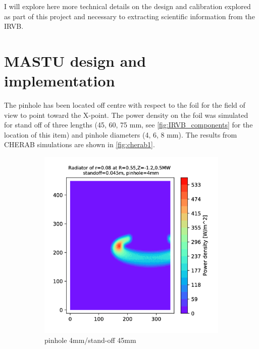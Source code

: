 I will explore here more technical details on the design and calibration explored as part of this project and necessary to extracting scientific information from the IRVB.
\section{MASTU design and implementation}\label{MASTUdesign}
The pinhole has been located off centre with respect to the foil for the field of view to point toward the X-point. The power density on the foil was simulated for stand off of three lengths (45, 60, 75 mm, see \autoref{fig:IRVB_components} for the location of this item) and pinhole diameters (4, 6, 8 mm). The results from CHERAB simulations are shown in \autoref{fig:cherab1}.


\begin{figure}
     \centering
     \begin{subfigure}{0.3\textwidth}
         \centering
         \includegraphics[trim={70 0 125 0},clip,width=\textwidth]{Chapters/appendix1/figs/4_45.png}
         \caption{pinhole 4mm/stand-off 45mm}
         \label{fig:4_45}
     \end{subfigure}
     \hfill
     \begin{subfigure}{0.3\textwidth}
         \centering

\end{subfigure}
\end{figure}
